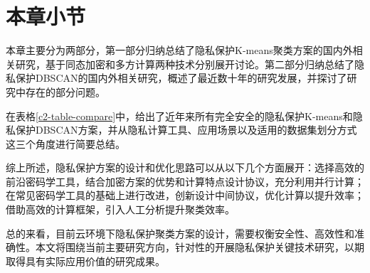 \newpage
\section{本章小节}
本章主要分为两部分，第一部分归纳总结了隐私保护K-means聚类方案的国内外相关研究，基于同态加密和多方计算两种技术分别展开讨论。第二部分归纳总结了隐私保护DBSCAN的国内外相关研究，概述了最近数十年的研究发展，并探讨了研究中存在的部分问题。

在表格\ref{c2-table-compare}中，给出了近年来所有完全安全的隐私保护K-means和隐私保护DBSCAN方案，并从隐私计算工具、应用场景以及适用的数据集划分方式这三个角度进行简要总结。

\begin{table}[htbp]
	\centering	
	\renewcommand{\arraystretch}{1.3}
	\caption{完全安全的隐私保护聚类方案}
	\label{c2-table-compare}
\end{table}

综上所述，隐私保护方案的设计和优化思路可以从以下几个方面展开：选择高效的前沿密码学工具，结合加密方案的优势和计算特点设计协议，充分利用并行计算\cite{wu2020secure}；在常见密码学工具的基础上进行改进，创新设计中间协议，优化计算以提升效率\cite{mohassel2019practical}；借助高效的计算框架，引入人工分析提升聚类效率\cite{bozdemir2021privacy}。

总的来看，目前云环境下隐私保护聚类方案的设计，需要权衡安全性、高效性和准确性。本文将围绕当前主要研究方向，针对性的开展隐私保护关键技术研究，以期取得具有实际应用价值的研究成果。


